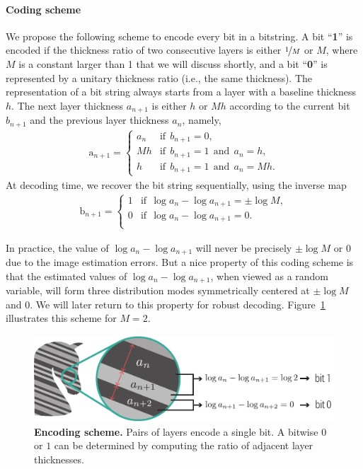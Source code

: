 \documentclass[12pt]{report}
\begin{document}
\paragraph{Coding scheme}
We propose the following scheme to encode every bit in a bitstring.
A bit ``\textbf{1}'' is encoded if the thickness ratio of two consecutive layers is either
$\nicefrac{1}{M}$ or $M$, where $M$ is a constant larger than 1 that we will
discuss shortly, and a bit ``\textbf{0}'' is represented by a unitary thickness ratio
(i.e., the same thickness).
The representation of a bit string always starts from a layer with a baseline
thickness $h$. The next layer thickness $a_{n+1}$ is either $h$ or $Mh$
according to the current bit $b_{n+1}$ and the previous layer thickness $a_n$, namely,
\begin{align}
\text{a}_{n+1} = \left.
  \begin{cases}
      a_n   & \text{if}~~b_{n+1} = 0, \\
      Mh  & \text{if}~~b_{n+1} = 1~~\text{and}~~a_n=h, \\
      h & \text{if}~~b_{n+1} = 1~~\text{and}~~a_n=Mh.
  \end{cases}
  \right.
\end{align}
At decoding time, we recover the bit string sequentially, using the inverse map
\begin{align}\label{eq:decode}
  \text{b}_{n+1} = \left.
  \begin{cases}
      1 & \text{if} ~~ \log{a_n} - \log{a_{n+1}} = \pm\log M,\\
    0 & \text{if} ~~ \log{a_n} - \log{a_{n+1}} = 0.\\
  \end{cases}
  \right.
\end{align}

In practice, the value of $\log{a_n}-\log{a_{n+1}}$ will never be
precisely $\pm\log M$ or $0$ due to the image estimation errors.
But a nice property of this coding scheme is that the estimated
values of $\log{a_n}-\log{a_{n+1}}$, when viewed as a random variable, will form 
three distribution modes symmetrically centered at $\pm\log M$ and $0$. 
We will later return to this property for robust decoding.
Figure~\ref{fig:ratio} illustrates this scheme for $M=2$.

\begin{figure}[H]
    \centering
    \includegraphics[width=0.85\columnwidth]{figs/ratio.pdf}
    \vspace{-2mm}
    \caption{\textbf{Encoding scheme.} Pairs of layers encode a single bit. A bitwise $0$ or $1$ can be determined by computing the ratio of adjacent layer thicknesses.
    \label{fig:ratio}}
    \vspace{-7mm}
\end{figure}
\end{document}
